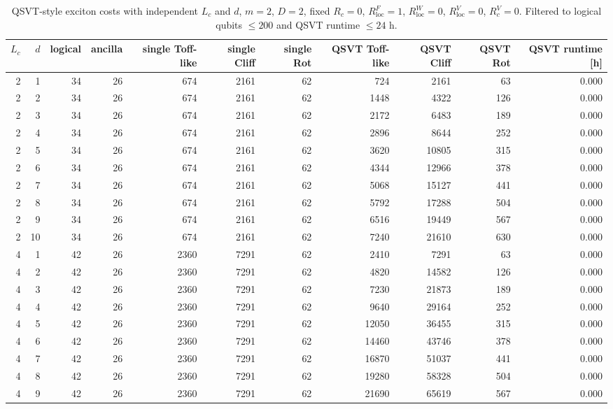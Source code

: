 \begin{table}[t]
\centering
\scriptsize
\caption{QSVT-style exciton costs with independent $L_c$ and $d$, $m=2$, $D=2$, fixed $R_c=0$, $R_{\mathrm{loc}}^F=1$, $R_{\mathrm{loc}}^W=0$, $R_{\mathrm{loc}}^V=0$, $R_c^V=0$. Filtered to logical qubits $\leq 200$ and QSVT runtime $\leq 24$ h.}
\begin{tabularx}{\linewidth}{rrrrrrrrrrr}
\toprule
$L_c$ & $d$ & logical & ancilla & single Toff-like & single Cliff & single Rot & QSVT Toff-like & QSVT Cliff & QSVT Rot & QSVT runtime [h] \\
\midrule
2 & 1 & 34 & 26 & 674 & 2161 & 62 & 724 & 2161 & 63 & 0.000 \\
2 & 2 & 34 & 26 & 674 & 2161 & 62 & 1448 & 4322 & 126 & 0.000 \\
2 & 3 & 34 & 26 & 674 & 2161 & 62 & 2172 & 6483 & 189 & 0.000 \\
2 & 4 & 34 & 26 & 674 & 2161 & 62 & 2896 & 8644 & 252 & 0.000 \\
2 & 5 & 34 & 26 & 674 & 2161 & 62 & 3620 & 10805 & 315 & 0.000 \\
2 & 6 & 34 & 26 & 674 & 2161 & 62 & 4344 & 12966 & 378 & 0.000 \\
2 & 7 & 34 & 26 & 674 & 2161 & 62 & 5068 & 15127 & 441 & 0.000 \\
2 & 8 & 34 & 26 & 674 & 2161 & 62 & 5792 & 17288 & 504 & 0.000 \\
2 & 9 & 34 & 26 & 674 & 2161 & 62 & 6516 & 19449 & 567 & 0.000 \\
2 & 10 & 34 & 26 & 674 & 2161 & 62 & 7240 & 21610 & 630 & 0.000 \\
4 & 1 & 42 & 26 & 2360 & 7291 & 62 & 2410 & 7291 & 63 & 0.000 \\
4 & 2 & 42 & 26 & 2360 & 7291 & 62 & 4820 & 14582 & 126 & 0.000 \\
4 & 3 & 42 & 26 & 2360 & 7291 & 62 & 7230 & 21873 & 189 & 0.000 \\
4 & 4 & 42 & 26 & 2360 & 7291 & 62 & 9640 & 29164 & 252 & 0.000 \\
4 & 5 & 42 & 26 & 2360 & 7291 & 62 & 12050 & 36455 & 315 & 0.000 \\
4 & 6 & 42 & 26 & 2360 & 7291 & 62 & 14460 & 43746 & 378 & 0.000 \\
4 & 7 & 42 & 26 & 2360 & 7291 & 62 & 16870 & 51037 & 441 & 0.000 \\
4 & 8 & 42 & 26 & 2360 & 7291 & 62 & 19280 & 58328 & 504 & 0.000 \\
4 & 9 & 42 & 26 & 2360 & 7291 & 62 & 21690 & 65619 & 567 & 0.000 \\

\end{tabularx}
\end{table}
